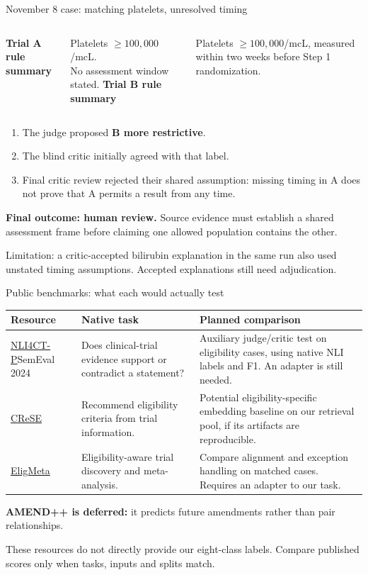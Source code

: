 \documentclass[aspectratio=169,11pt]{beamer}
\newcommand{\gap}{\par\vspace{.55em}}
\begin{document}
\begin{frame}{November 8 case: matching platelets, unresolved timing}
\begin{columns}[T,onlytextwidth]
\textbf{Trial A rule summary}
\gap
Platelets $\geq100{,}000$/mcL.\\
No assessment window stated.
\textbf{Trial B rule summary}
\gap
Platelets $\geq100{,}000$/mcL, measured within two weeks before Step 1 randomization.
\end{columns}
\gap
\begin{enumerate}
\item The judge proposed \textbf{B more restrictive}.
\item The blind critic initially agreed with that label.
\item Final critic review rejected their shared assumption: missing timing in
A does not prove that A permits a result from any time.
\end{enumerate}
\gap
\textbf{Final outcome: human review.} Source evidence must establish a shared
assessment frame before claiming one allowed population contains the other.
\gap
{\small Limitation: a critic-accepted bilirubin explanation in the same run also
used unstated timing assumptions. Accepted explanations still need adjudication.}
\end{frame}






\begin{frame}{Public benchmarks: what each would actually test}
\begingroup\small
\begin{tabularx}{\textwidth}{@{}p{}p{}Y@{}}
\toprule
Resource & Native task & Planned comparison\\\midrule
\href{https://aclanthology.org/2024.semeval-1.271/}{NLI4CT-P}\newline SemEval 2024 & Does clinical-trial evidence support or contradict a statement? & Auxiliary judge/critic test on eligibility cases, using native NLI labels and F1. An adapter is still needed.\\
\href{https://aclanthology.org/2024.findings-eacl.149/}{CReSE} & Recommend eligibility criteria from trial information. & Potential eligibility-specific embedding baseline on our retrieval pool, if its artifacts are reproducible.\\
\href{https://arxiv.org/abs/2604.02678}{EligMeta} & Eligibility-aware trial discovery and meta-analysis. & Compare alignment and exception handling on matched cases. Requires an adapter to our task.\\\bottomrule
\end{tabularx}
\endgroup
\gap
\textbf{AMEND++ is deferred:} it predicts future amendments rather than pair relationships.
\gap
{\small These resources do not directly provide our eight-class labels. Compare
published scores only when tasks, inputs and splits match.}
\end{frame}
\end{document}
